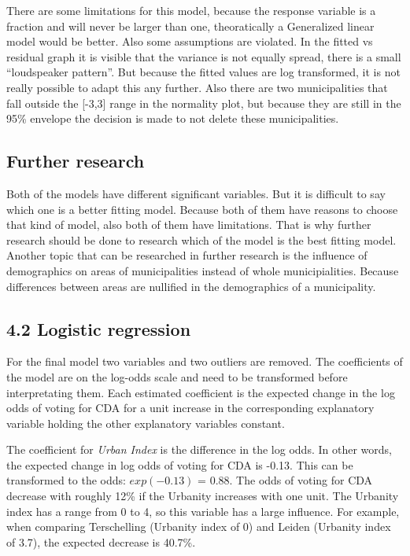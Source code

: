 \documentclass[11pt,]{article}
\begin{document}
There are some limitations for this model, because the response variable
is a fraction and will never be larger than one, theoratically a
Generalized linear model would be better. Also some assumptions are
violated. In the fitted vs residual graph it is visible that the
variance is not equally spread, there is a small ``loudspeaker
pattern''. But because the fitted values are log transformed, it is not
really possible to adapt this any further. Also there are two
municipalities that fall outside the {[}-3,3{]} range in the normality
plot, but because they are still in the 95\% envelope the decision is
made to not delete these municipalities.

\subsection{Further research}\label{further-research}

Both of the models have different significant variables. But it is
difficult to say which one is a better fitting model. Because both of
them have reasons to choose that kind of model, also both of them have
limitations. That is why further research should be done to research
which of the model is the best fitting model. Another topic that can be
researched in further research is the influence of demographics on areas
of municipalities instead of whole municipialities. Because differences
between areas are nullified in the demographics of a municipality.

\subsection{4.2 Logistic regression}\label{logistic-regression-1}

For the final model two variables and two outliers are removed. The
coefficients of the model are on the log-odds scale and need to be
transformed before interpretating them. Each estimated coefficient is
the expected change in the log odds of voting for CDA for a unit
increase in the corresponding explanatory variable holding the other
explanatory variables constant.

The coefficient for \emph{Urban Index} is the difference in the log
odds. In other words, the expected change in log odds of voting for CDA
is -0.13. This can be transformed to the odds: \(exp(-0.13)\) = 0.88.
The odds of voting for CDA decrease with roughly 12\% if the Urbanity
increases with one unit. The Urbanity index has a range from 0 to 4, so
this variable has a large influence. For example, when comparing
Terschelling (Urbanity index of 0) and Leiden (Urbanity index of 3.7),
the expected decrease is 40.7\%.
\end{document}
